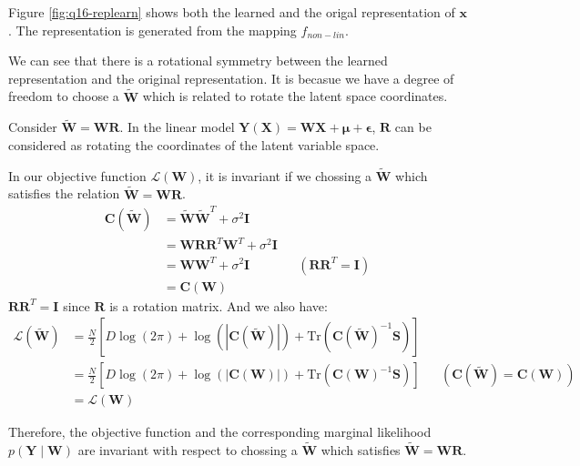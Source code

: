 \documentclass[12pt]{article}
\newenvironment{question}[2][Question]{\begin{trivlist}
\kern10pt
\item[\hskip \labelsep {\bfseries #1}\hskip \labelsep {\bfseries #2.}]}{\end{trivlist}}
\begin{document}
\begin{question}{16}
Figure \ref{fig:q16-replearn} shows both the learned and the origal 
representation of $\mathbf{x}$.
The representation is generated from the mapping $f_{non-lin}$.

We can see that there is a rotational symmetry between the learned representation
and the original representation. It is becasue we have a degree of freedom to choose
a $\widetilde{\mathbf{W}}$ which is related to rotate the latent space coordinates.

Consider $\widetilde{\mathbf{W}} = \mathbf{WR}$. In the linear model 
$\mathbf{Y}(\mathbf{X}) = \mathbf{WX} + \bm{\mu} + \bm{\epsilon}$, 
$\mathbf{R}$ can be considered as rotating the coordinates of the 
latent variable space.

In our objective function $\mathcal{L}(\mathbf{W})$, it is invariant if we chossing
a $\widetilde{\mathbf{W}}$ which satisfies the relation $\widetilde{\mathbf{W}} = \mathbf{WR}$.
  \begin{align*}
    \mathbf{C}(\widetilde{\mathbf{W}}) 
      &= \widetilde{\mathbf{W}}\widetilde{\mathbf{W}}^T + \sigma^2\mathbf{I} \\
      &= \mathbf{W}\mathbf{R}\mathbf{R}^T\mathbf{W}^T + \sigma^2\mathbf{I} \\
      &= \mathbf{W}\mathbf{W}^T + \sigma^2\mathbf{I}
        && (\mathbf{R}\mathbf{R}^T = \mathbf{I}) \\
      &= \mathbf{C}(\mathbf{W})
  \end{align*}
$\mathbf{R}\mathbf{R}^T = \mathbf{I}$ since $\mathbf{R}$ is a rotation matrix.
And we also have:
  \begin{align*}
    \mathcal{L}(\widetilde{\mathbf{W}})
      &= \frac{N}{2}[D\log(2\pi) 
        + \log(|\mathbf{C}(\widetilde{\mathbf{W}})|) 
        + \text{Tr}(\mathbf{C}(\widetilde{\mathbf{W}})^{-1}\mathbf{S})] \\
      &= \frac{N}{2}[D\log(2\pi) 
        + \log(|\mathbf{C}(\mathbf{W})|) 
        + \text{Tr}(\mathbf{C}(\mathbf{W})^{-1}\mathbf{S})]
        && (\mathbf{C}(\widetilde{\mathbf{W}}) = \mathbf{C}(\mathbf{W})) \\
      &= \mathcal{L}(\mathbf{W})
  \end{align*}

Therefore, the objective function and the corresponding marginal likelihood
$p(\mathbf{Y}\mid\mathbf{W})$
are invariant with respect to chossing a $\widetilde{\mathbf{W}}$ which satisfies
$\widetilde{\mathbf{W}} = \mathbf{WR}$.


\end{question}
\end{document}
